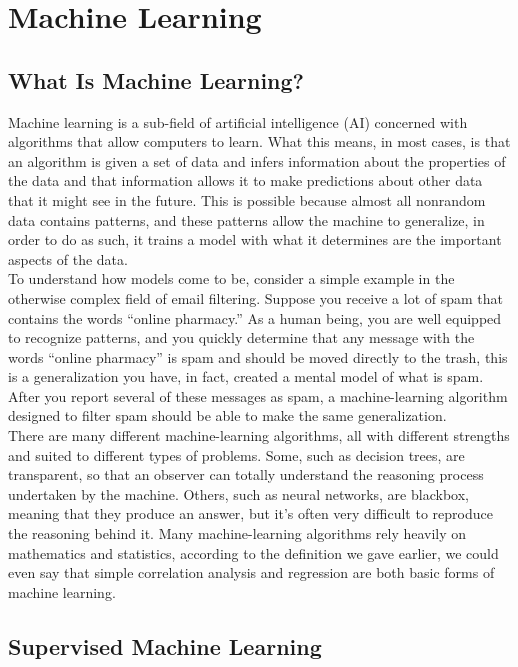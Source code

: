 
\chapter{Machine Learning}

\section{What Is Machine Learning?}

Machine learning is a sub-field of artificial intelligence (AI) concerned with algorithms
that allow computers to learn. What this means, in most cases, is that an
algorithm is given a set of data and infers information about the properties of the
data and that information allows it to make predictions about other data that it
might see in the future. This is possible because almost all nonrandom data contains
patterns, and these patterns allow the machine to generalize, in order to do as such, it
trains a model with what it determines are the important aspects of the data.\\
\newline
To understand how models come to be, consider a simple example in the otherwise
complex field of email filtering. Suppose you receive a lot of spam that contains the
words “online pharmacy.” As a human being, you are well equipped to recognize patterns,
and you quickly determine that any message with the words “online pharmacy” is spam and should be moved directly to the trash, this is a generalization you have,
in fact, created a mental model of what is spam.\\ After you report several of these
messages as spam, a machine-learning algorithm designed to filter spam should be
able to make the same generalization.\\
\newline
There are many different machine-learning algorithms, all with different strengths
and suited to different types of problems. Some, such as decision trees, are transparent,
so that an observer can totally understand the reasoning process undertaken by
the machine. Others, such as neural networks, are blackbox, meaning that they produce
an answer, but it’s often very difficult to reproduce the reasoning behind it.
Many machine-learning algorithms rely heavily on mathematics and statistics, according to the definition we gave earlier, we could even say that simple correlation
analysis and regression are both basic forms of machine learning. 
\section{Supervised Machine Learning}

